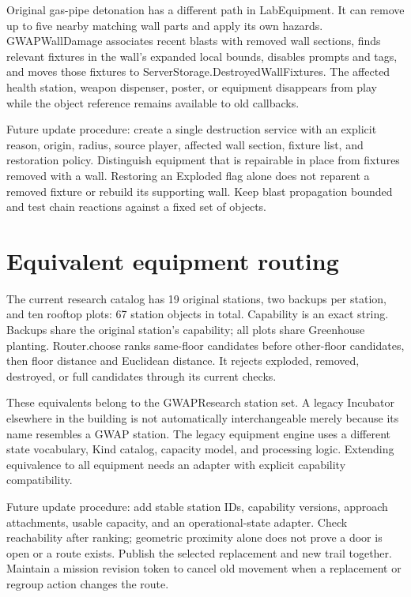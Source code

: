 Original gas-pipe detonation has a different path in LabEquipment.\allowbreak{} It can remove up to five nearby matching wall parts and apply its own hazards.\allowbreak{} GWAPWallDamage associates recent blasts with removed wall sections, finds relevant fixtures in the wall's expanded local bounds, disables prompts and tags, and moves those fixtures to ServerStorage.\allowbreak{}DestroyedWallFixtures.\allowbreak{} The affected health station, weapon dispenser, poster, or equipment disappears from play while the object reference remains available to old callbacks.\allowbreak{}

Future update procedure: create a single destruction service with an explicit reason, origin, radius, source player, affected wall section, fixture list, and restoration policy.\allowbreak{} Distinguish equipment that is repairable in place from fixtures removed with a wall.\allowbreak{} Restoring an Exploded flag alone does not reparent a removed fixture or rebuild its supporting wall.\allowbreak{} Keep blast propagation bounded and test chain reactions against a fixed set of objects.\allowbreak{}

\section{Equivalent equipment routing}
The current research catalog has 19 original stations, two backups per station, and ten rooftop plots: 67 station objects in total.\allowbreak{} Capability is an exact string.\allowbreak{} Backups share the original station's capability; all plots share Greenhouse planting.\allowbreak{} Router.\allowbreak{}choose ranks same-floor candidates before other-floor candidates, then floor distance and Euclidean distance.\allowbreak{} It rejects exploded, removed, destroyed, or full candidates through its current checks.\allowbreak{}

These equivalents belong to the GWAPResearch station set.\allowbreak{} A legacy Incubator elsewhere in the building is not automatically interchangeable merely because its name resembles a GWAP station.\allowbreak{} The legacy equipment engine uses a different state vocabulary, Kind catalog, capacity model, and processing logic.\allowbreak{} Extending equivalence to all equipment needs an adapter with explicit capability compatibility.\allowbreak{}

Future update procedure: add stable station IDs, capability versions, approach attachments, usable capacity, and an operational-state adapter.\allowbreak{} Check reachability after ranking; geometric proximity alone does not prove a door is open or a route exists.\allowbreak{} Publish the selected replacement and new trail together.\allowbreak{} Maintain a mission revision token to cancel old movement when a replacement or regroup action changes the route.\allowbreak{}

